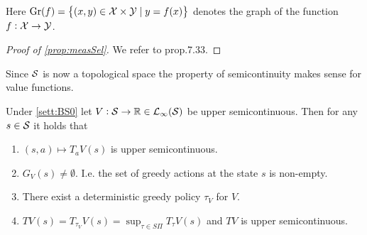\begin{rem}
  Here $\mathrm{Gr}(f) = \left\{ (x, y) \in \mathcal{X} \times \mathcal{Y}
  \mid y = f(x) \right\}$ denotes the graph of the function
  $f : \mathcal{X} \to \mathcal{Y}$.
\end{rem}

\begin{proof}[Proof of \cref{prop:measSel}]
  We refer to  prop.7.33.
\end{proof}

Since $\mathcal{S}$ is now a topological space the property of semicontinuity
makes sense for value functions.

\begin{prop}
  Under \cref{sett:BS0}
  let $V:\mathcal{S} \to \mathbb{R} \in \mathcal{L}_\infty(\mathcal{S})$ be upper semicontinuous.
  Then for any $s \in \mathcal{S}$ it holds that
  \leavevmode
  \begin{enumerate}
    \item $(s, a) \mapsto T_a V(s)$ is upper semicontinuous.
    \item $G_V(s) \neq \emptyset$. 
      I.e. the set of greedy actions at the state $s$ is non-empty.
    \item There exist a deterministic greedy policy $\tau_V$ for $V$.
    \item $TV(s) = T_{\tau_V} V(s) = \sup_{\tau \in S\Pi} T_\tau V(s)$
	and $TV$ is upper semicontinuous.
  \end{enumerate}
  \label{prop:greedyExi}
\end{prop}

